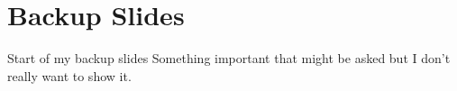 \documentclass[xcolor=svgnames,10pt,aspectratio=169]{beamer}
\begin{document}
    \section*{Backup Slides}
    \backupbegin
    \begin{frame}{Start of my backup slides}
    Something important that might be asked but I don't really want to show it.
    \end{frame}
    \backupend
\end{document}
